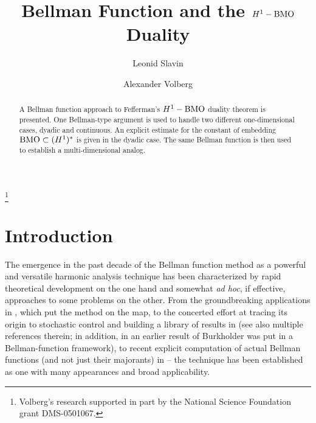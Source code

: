 \documentclass[psamsfonts]{conm-p-l}
\theoremstyle{definition}
\theoremstyle{remark}
\numberwithin{equation}{section}
\begin{document}
\title{Bellman Function and the $H^1-{{\rm{BMO}}}$ Duality}

\author{Leonid Slavin}
\address{Department of Mathematics, University of Connecticut, Storrs, Connecticut 06269}

\author{Alexander Volberg}
\address{Department of Mathematics, Michigan State University,
East Lansing, Michigan 48824}
\thanks{Volberg's research supported in part by the National Science Foundation grant DMS-0501067.}



\begin{abstract}
A Bellman function approach to Fefferman's $H^1-{{\rm{BMO}}}$ duality theorem is presented. One Bellman-type argument is used to handle two different one-dimensional cases, dyadic and continuous. An explicit estimate for the constant of embedding ${{\rm{BMO}}}\subset (H^1)^*$ is given in the dyadic case. The same Bellman function is then used to establish a multi-dimensional analog.
\end{abstract}

\maketitle

\section*{Introduction} 
The emergence in the past decade of the Bellman function method as a powerful and versatile harmonic analysis technique has been characterized by rapid theoretical development on the one hand and somewhat {\it ad hoc}, if effective, approaches to some problems on the other. From the groundbreaking applications in \cite{haar,nt,haar1}, which put the method on the map, to the concerted effort at tracing its origin to stochastic control and building a library of results in \cite{vol, vol1} (see also multiple references therein; in addition, in \cite{vol} an earlier result of Burkholder \cite{burkholder} was put in a Bellman-function framework), to recent explicit computation of actual Bellman functions (and not just their majorants) in \cite{vasyunin, melas, vv, sv} -- the technique has been established as one with many appearances and broad applicability.
\end{document}
